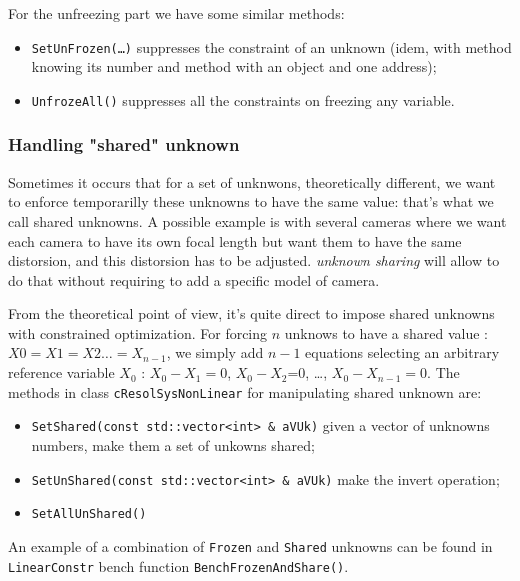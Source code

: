 For the unfreezing part we have some similar methods:

\begin{itemize}
	\item   {\tt SetUnFrozen(\dots)} suppresses the constraint of an unknown (idem, with method knowing its number
		and method with an object and one address);
      \item  {\tt UnfrozeAll()} suppresses all the constraints on freezing any variable.
\end{itemize}


\subsubsection{Handling "shared" unknown}

Sometimes it occurs  that for a set of unknwons, theoretically different,  we want to enforce
temporarilly these unknowns to have the same value: that's what we call shared unknowns. 
A possible example is with several cameras where we want each camera to have its own focal length
but want them to have the same distorsion, and this distorsion
has to be adjusted.  \emph{unknown sharing} will allow to do that without requiring to add a specific model of camera.

From the theoretical point of view, it's quite direct to impose shared unknowns  with constrained optimization.  For forcing
$n$ unknows to have a shared value : $X0=X1=X2\dots=X_{n-1}$, we simply add $n-1$ equations selecting
an arbitrary reference variable $X_0$ : $X_0-X_1=0$, $X_0-X_2$=0, \dots , $X_0-X_{n-1}=0$.
The methods in class {\tt cResolSysNonLinear} for manipulating shared unknown are:

\begin{itemize}
    \item   {\tt SetShared(const std::vector<int> \&  aVUk)}  given a vector of unknowns numbers,
            make them a set of unkowns shared;
    \item   {\tt SetUnShared(const std::vector<int> \&  aVUk)} make the invert operation;
    \item   {\tt SetAllUnShared()} 
\end{itemize}

An example of a combination of {\tt Frozen} and {\tt Shared} unknowns can be found in {\tt LinearConstr} bench function {\tt BenchFrozenAndShare()}.

